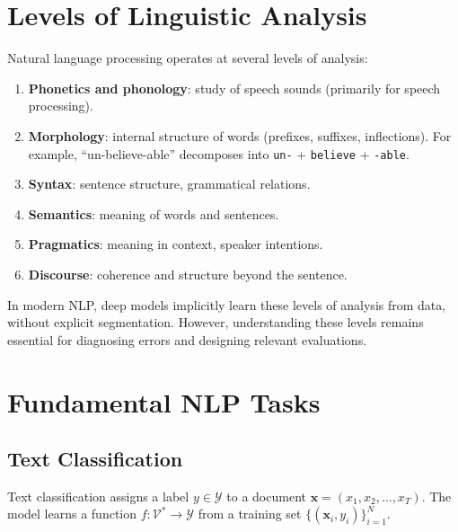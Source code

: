 \section{Levels of Linguistic Analysis}
\label{sec:intro:levels}

Natural language processing operates at several levels of analysis:

\begin{enumerate}
    \item \textbf{Phonetics and phonology}: study of speech sounds (primarily
          for speech processing).
    \item \textbf{Morphology}: internal structure of words (prefixes, suffixes,
          inflections). For example, ``un-believe-able'' decomposes into
          \texttt{un-} + \texttt{believe} + \texttt{-able}.
    \item \textbf{Syntax}: sentence structure, grammatical relations.
    \item \textbf{Semantics}: meaning of words and sentences.
    \item \textbf{Pragmatics}: meaning in context, speaker intentions.
    \item \textbf{Discourse}: coherence and structure beyond the sentence.
\end{enumerate}

\begin{remark}
In modern NLP, deep models implicitly learn these levels of analysis from data,
without explicit segmentation. However, understanding these levels remains
essential for diagnosing errors and designing relevant evaluations.
\end{remark}

\section{Fundamental NLP Tasks}
\label{sec:intro:tasks}

\subsection{Text Classification}

Text classification assigns a label $y \in \mathcal{Y}$ to a document
$\mathbf{x} = (x_1, x_2, \ldots, x_T)$. The model learns a function
$f : \mathcal{V}^* \to \mathcal{Y}$ from a training set
$\{(\mathbf{x}_i, y_i)\}_{i=1}^{N}$.

